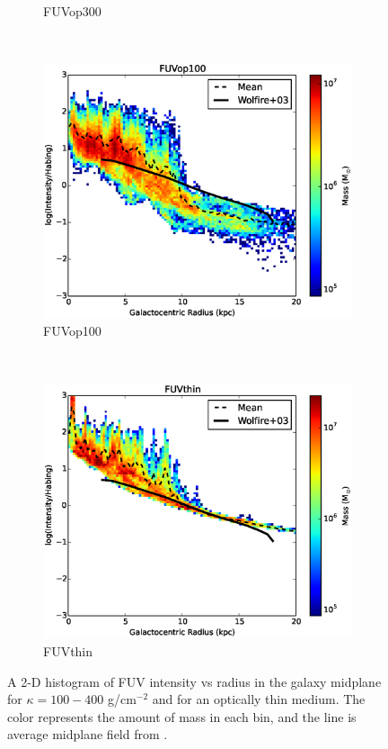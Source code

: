 \begin{figure}
\begin{subfigure}[b]{0.45\textwidth}
                \caption{FUVop300}
                \label{fig:intensityop300}
        \end{subfigure}
        \\
        \begin{subfigure}[b]{0.45\textwidth}
                \includegraphics[width=\textwidth]{graphics/intensityvrRadFUVop100_J300200.eps}
                \caption{FUVop100}
                \label{fig:intensityop100}
        \end{subfigure}
        ~
        \begin{subfigure}[b]{0.45\textwidth}
                \includegraphics[width=\textwidth]{graphics/intensityvrRadFUVthin_J300200.eps}
                \caption{FUVthin}
                \label{fig:intensitythin}
        \end{subfigure}
        \caption[Intensity with varying opacity.]{A 2-D histogram of FUV intensity vs radius in the galaxy midplane for $\kappa = 100 - 400$ g/cm$^{-2}$ and for an optically thin medium. The color represents the amount of mass in each bin, and the line is average midplane field from \citet{wolfireEt03}.}
        \label{fig:intensityvopacity}
\end{figure}

